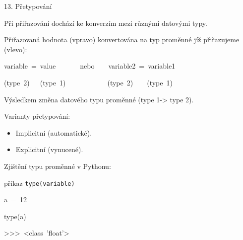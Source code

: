 \documentclass[czech]{beamer}
\newenvironment{lyxcode}
  {\par\begin{list}{}{
    \setlength{\rightmargin}{\leftmargin}
    \setlength{\listparindent}{0pt}%
    \raggedright
    \setlength{\itemsep}{0pt}
    \setlength{\parsep}{0pt}
    \normalfont\ttfamily}%
   \def\{{\char`\{}
   \def\}{\char`\}}
   \def\textasciitilde{\char`\~}
   \item[]}
  {\end{list}}
\begin{document}
\begin{frame}{13. Přetypování}

{\footnotesize Při přiřazování dochází ke konverzím mezi různými datovými
typy. \bigskip{}
}{\footnotesize\par}

{\footnotesize Přiřazovaná hodnota (vpravo) konvertována na typ proměnné
jíž přiřazujeme (vlevo):}{\footnotesize\par}
\begin{lyxcode}
{\footnotesize variable~=~value~~~~~~~nebo~~~~variable2~=~variable1~}{\footnotesize\par}

{\footnotesize (type~2)~~~(type~1)~~~~~~~~~~~~(type~2)~~~~(type~1)~}{\footnotesize\par}
\end{lyxcode}
{\footnotesize Výsledkem změna datového typu proměnné (type 1-> type
2).\bigskip{}
}{\footnotesize\par}

{\footnotesize Varianty přetypování:}{\footnotesize\par}
\begin{itemize}
\item {\footnotesize Implicitní (automatické).}{\footnotesize\par}
\item {\footnotesize Explicitní (vynucené).}{\footnotesize\par}
\end{itemize}
{\footnotesize Zjištění typu proměnné v Pythonu: }{\footnotesize\par}

{\footnotesize příkaz }{\footnotesize\texttt{type(variable)}}{\footnotesize\par}
\begin{lyxcode}
{\footnotesize a~=~12}{\footnotesize\par}

{\footnotesize type(a)}{\footnotesize\par}

{\footnotesize >\textcompwordmark >\textcompwordmark >~<class~'float'>}{\footnotesize\par}
\end{lyxcode}
\end{frame}
\end{document}

